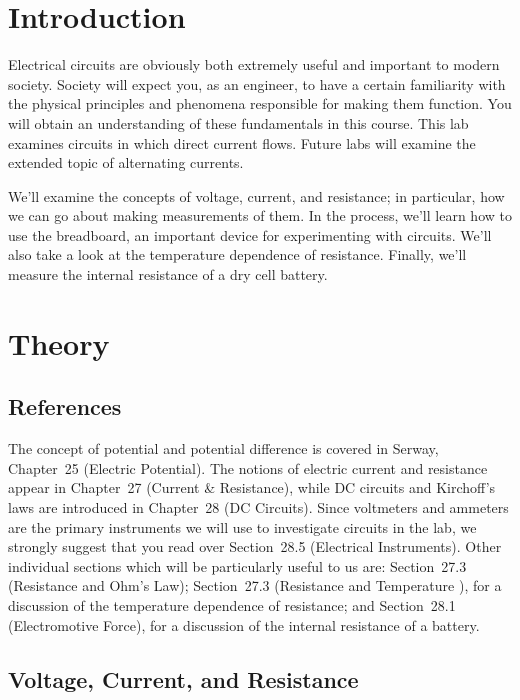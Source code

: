 
\section{Introduction}
Electrical circuits are obviously both extremely useful and important to
modern society.  Society will expect you, as an engineer, to have a certain 
familiarity with the physical principles and phenomena responsible for making 
them function. You will obtain an understanding of these fundamentals in this 
course.  This lab examines circuits in which direct current flows. Future labs 
will examine the extended topic of alternating currents. 
  
We'll examine the concepts of voltage, current, and resistance; in particular,
how we can go about making measurements of them. In the process, we'll learn 
how to use the breadboard, an important device for experimenting with circuits.
We'll also take a look at the temperature dependence of resistance.  Finally,
we'll measure the internal resistance of a dry cell battery.

\section{Theory}

\subsection{References}

The concept of potential and potential difference is covered in Serway, 
Chapter~25 (Electric Potential).  The notions of electric current and 
resistance appear in Chapter~27 (Current \& Resistance), while DC 
circuits and Kirchoff's laws are introduced in Chapter~28 (DC Circuits). 
Since voltmeters and ammeters are the primary instruments we will use
to investigate circuits in the lab, we strongly suggest that you read over 
Section~28.5 (Electrical Instruments).  Other individual sections 
which will be particularly useful to us are: Section~27.3 (Resistance and 
Ohm's Law); Section~27.3 (Resistance and Temperature ), 
for a discussion of the temperature dependence of resistance; and 
Section~28.1 (Electromotive Force), for a discussion of the internal 
resistance of a battery. 
 
\subsection{Voltage, Current, and Resistance}

